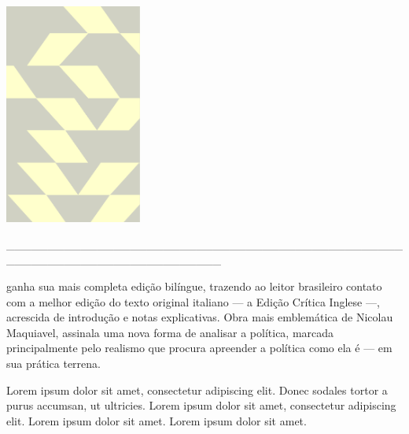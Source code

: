 \pagebreak

\hspace{.5cm}

\begin{center}
\hspace*{-.5cm}\includegraphics[width=45mm]{./imgs/maquiavel.png}
\end{center}

\hspace*{-2cm}\_\_\_\_\_\_\_\_\_\_\_\_\_\_\_\_\_\_\_\_\_\_\_\_\_\_\_\_\_\_\_\_\_\_\_\_\_\_\_\_\_\_\_\_\_\_\_\_\_\_\_\_\_\_\_\_\_\_\_\_\_\_\_\_\_\_\_\_\_\_\_\_\_\_

\medskip

 ganha sua mais completa edição bilíngue, trazendo ao leitor brasileiro contato com a melhor edição do texto original italiano --- a Edição Crítica Inglese ---, acrescida de introdução e notas explicativas. Obra mais emblemática de Nicolau Maquiavel, {} assinala uma nova forma de analisar a política, marcada principalmente pelo realismo que procura apreender a política como ela é --- em sua prática terrena.

\hspace{.5cm}

\hspace*{-.4cm}\begin{minipage}[c]{0.45\linewidth}
\small{
{}}
\end{minipage}
\begin{minipage}[c]{0.50\linewidth}
\small{Lorem ipsum dolor sit amet, consectetur adipiscing elit.
Donec sodales tortor a purus accumsan, ut ultricies. Lorem ipsum dolor sit amet, consectetur adipiscing elit. Lorem ipsum dolor sit amet. Lorem ipsum dolor sit amet.} 
\end{minipage}

